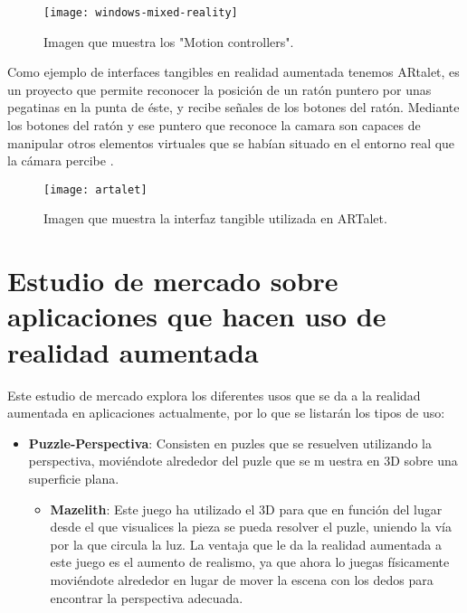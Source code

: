 \begin{itemize}
\begin{itemize}
\begin{figure}[h]
  \centering
  \texttt{[image: windows-mixed-reality]}
  \caption{Imagen que muestra los "Motion controllers".\protect\footnotemark}
  \label{figura-windowsmixedreality}
\end{figure}


\newpage

Como ejemplo de interfaces tangibles en realidad aumentada tenemos ARtalet, es un proyecto que permite reconocer la posición de un ratón puntero por unas pegatinas en la punta de éste, y recibe señales de los botones del ratón. Mediante los botones del ratón y ese puntero que reconoce la camara son capaces de manipular otros elementos virtuales que se habían situado en el entorno real que la cámara percibe \cite{ha}.\\

\begin{figure}[h]
  \centering
  \texttt{[image: artalet]}
  \caption{Imagen que muestra la interfaz tangible utilizada en ARTalet.\protect\footnotemark}
  \label{figura-artalet}
\end{figure}



\section{Estudio de mercado sobre aplicaciones que hacen uso de realidad aumentada}

Este estudio de mercado explora los diferentes usos que se da a la realidad aumentada en aplicaciones actualmente, por lo que se listarán los tipos de uso:

\begin{itemize}
  \item \textbf{Puzzle-Perspectiva}: Consisten en puzles que se resuelven utilizando la perspectiva, moviéndote alrededor del puzle que se m uestra en 3D sobre una superficie plana.
  \begin{itemize}
    \item \textbf{Mazelith}: Este juego ha utilizado el 3D para que en función del lugar desde el que visualices la pieza se pueda resolver el puzle, uniendo la vía por la que circula la luz. La ventaja que le da la realidad aumentada a este juego es el aumento de realismo, ya que ahora lo juegas físicamente moviéndote alrededor en lugar de mover la escena con los dedos para encontrar la perspectiva adecuada.


\end{itemize}
\end{itemize}
\end{itemize}
\end{itemize}

